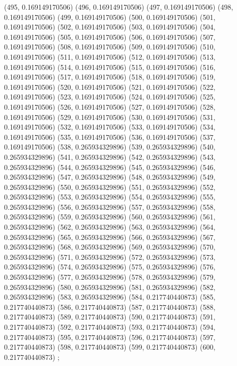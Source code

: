 {					(495, 0.169149170506)
					(496, 0.169149170506)
					(497, 0.169149170506)
					(498, 0.169149170506)
					(499, 0.169149170506)
					(500, 0.169149170506)
					(501, 0.169149170506)
					(502, 0.169149170506)
					(503, 0.169149170506)
					(504, 0.169149170506)
					(505, 0.169149170506)
					(506, 0.169149170506)
					(507, 0.169149170506)
					(508, 0.169149170506)
					(509, 0.169149170506)
					(510, 0.169149170506)
					(511, 0.169149170506)
					(512, 0.169149170506)
					(513, 0.169149170506)
					(514, 0.169149170506)
					(515, 0.169149170506)
					(516, 0.169149170506)
					(517, 0.169149170506)
					(518, 0.169149170506)
					(519, 0.169149170506)
					(520, 0.169149170506)
					(521, 0.169149170506)
					(522, 0.169149170506)
					(523, 0.169149170506)
					(524, 0.169149170506)
					(525, 0.169149170506)
					(526, 0.169149170506)
					(527, 0.169149170506)
					(528, 0.169149170506)
					(529, 0.169149170506)
					(530, 0.169149170506)
					(531, 0.169149170506)
					(532, 0.169149170506)
					(533, 0.169149170506)
					(534, 0.169149170506)
					(535, 0.169149170506)
					(536, 0.169149170506)
					(537, 0.169149170506)
					(538, 0.265934329896)
					(539, 0.265934329896)
					(540, 0.265934329896)
					(541, 0.265934329896)
					(542, 0.265934329896)
					(543, 0.265934329896)
					(544, 0.265934329896)
					(545, 0.265934329896)
					(546, 0.265934329896)
					(547, 0.265934329896)
					(548, 0.265934329896)
					(549, 0.265934329896)
					(550, 0.265934329896)
					(551, 0.265934329896)
					(552, 0.265934329896)
					(553, 0.265934329896)
					(554, 0.265934329896)
					(555, 0.265934329896)
					(556, 0.265934329896)
					(557, 0.265934329896)
					(558, 0.265934329896)
					(559, 0.265934329896)
					(560, 0.265934329896)
					(561, 0.265934329896)
					(562, 0.265934329896)
					(563, 0.265934329896)
					(564, 0.265934329896)
					(565, 0.265934329896)
					(566, 0.265934329896)
					(567, 0.265934329896)
					(568, 0.265934329896)
					(569, 0.265934329896)
					(570, 0.265934329896)
					(571, 0.265934329896)
					(572, 0.265934329896)
					(573, 0.265934329896)
					(574, 0.265934329896)
					(575, 0.265934329896)
					(576, 0.265934329896)
					(577, 0.265934329896)
					(578, 0.265934329896)
					(579, 0.265934329896)
					(580, 0.265934329896)
					(581, 0.265934329896)
					(582, 0.265934329896)
					(583, 0.265934329896)
					(584, 0.217740440873)
					(585, 0.217740440873)
					(586, 0.217740440873)
					(587, 0.217740440873)
					(588, 0.217740440873)
					(589, 0.217740440873)
					(590, 0.217740440873)
					(591, 0.217740440873)
					(592, 0.217740440873)
					(593, 0.217740440873)
					(594, 0.217740440873)
					(595, 0.217740440873)
					(596, 0.217740440873)
					(597, 0.217740440873)
					(598, 0.217740440873)
					(599, 0.217740440873)
					(600, 0.217740440873)
				};
